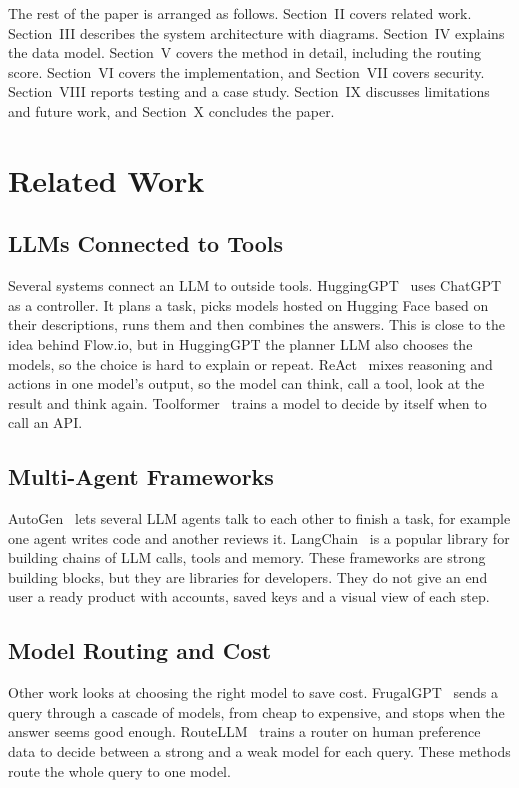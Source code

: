 \documentclass[conference]{IEEEtran}
\begin{document}
The rest of the paper is arranged as follows. Section~II covers related work. Section~III describes the
system architecture with diagrams. Section~IV explains the data model. Section~V covers the method in
detail, including the routing score. Section~VI covers the implementation, and Section~VII covers
security. Section~VIII reports testing and a case study. Section~IX discusses limitations and future
work, and Section~X concludes the paper.

\section{Related Work}

\subsection{LLMs Connected to Tools}
Several systems connect an LLM to outside tools. HuggingGPT~\cite{hugginggpt} uses ChatGPT as a
controller. It plans a task, picks models hosted on Hugging Face based on their descriptions, runs them
and then combines the answers. This is close to the idea behind Flow.io, but in HuggingGPT the planner
LLM also chooses the models, so the choice is hard to explain or repeat. ReAct~\cite{react} mixes
reasoning and actions in one model's output, so the model can think, call a tool, look at the result and
think again. Toolformer~\cite{toolformer} trains a model to decide by itself when to call an API.

\subsection{Multi-Agent Frameworks}
AutoGen~\cite{autogen} lets several LLM agents talk to each other to finish a task, for example one agent
writes code and another reviews it. LangChain~\cite{langchain} is a popular library for building chains
of LLM calls, tools and memory. These frameworks are strong building blocks, but they are libraries for
developers. They do not give an end user a ready product with accounts, saved keys and a visual view of
each step.

\subsection{Model Routing and Cost}
Other work looks at choosing the right model to save cost. FrugalGPT~\cite{frugalgpt} sends a query
through a cascade of models, from cheap to expensive, and stops when the answer seems good enough.
RouteLLM~\cite{routellm} trains a router on human preference data to decide between a strong and a weak
model for each query. These methods route the whole query to one model.
\end{document}
